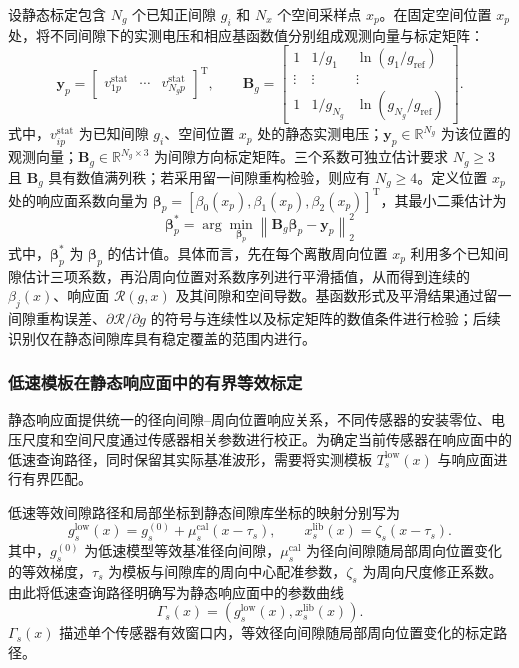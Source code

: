 \documentclass[UTF8,12pt,a4paper]{ctexart}
\newcommand{\Rcal}{\mathcal{R}}
\begin{document}
设静态标定包含 $N_g$ 个已知正间隙 $g_i$ 和 $N_x$ 个空间采样点 $x_p$。在固定空间位置 $x_p$ 处，将不同间隙下的实测电压和相应基函数值分别组成观测向量与标定矩阵：
\begin{equation}
\bm y_p=
\begin{bmatrix}
v_{1p}^{\mathrm{stat}} & \cdots & v_{N_gp}^{\mathrm{stat}}
\end{bmatrix}^{\mathrm T},
\qquad
\bm B_g=
\begin{bmatrix}
1 & 1/g_1 & \ln(g_1/g_{\mathrm{ref}})\\
\vdots & \vdots & \vdots\\
1 & 1/g_{N_g} & \ln(g_{N_g}/g_{\mathrm{ref}})
\end{bmatrix}.
\label{eq:cal_matrix}
\end{equation}
式中，$v_{ip}^{\mathrm{stat}}$ 为已知间隙 $g_i$、空间位置 $x_p$ 处的静态实测电压；$\bm y_p\in\mathbb R^{N_g}$ 为该位置的观测向量；$\bm B_g\in\mathbb R^{N_g\times3}$ 为间隙方向标定矩阵。三个系数可独立估计要求 $N_g\geq3$ 且 $\bm B_g$ 具有数值满列秩；若采用留一间隙重构检验，则应有 $N_g\geq4$。定义位置 $x_p$ 处的响应面系数向量为 $\bm\beta_p=[\beta_0(x_p),\beta_1(x_p),\beta_2(x_p)]^{\mathrm T}$，其最小二乘估计为
\begin{equation}
\bm\beta_p^*
=\arg\min_{\bm\beta_p}
\left\lVert \bm B_g\bm\beta_p-\bm y_p\right\rVert_2^2
\label{eq:cal_ls}
\end{equation}
式中，$\bm\beta_p^*$ 为 $\bm\beta_p$ 的估计值。具体而言，先在每个离散周向位置 $x_p$ 利用多个已知间隙估计三项系数，再沿周向位置对系数序列进行平滑插值，从而得到连续的 $\beta_j(x)$、响应面 $\Rcal(g,x)$ 及其间隙和空间导数。基函数形式及平滑结果通过留一间隙重构误差、$\partial\Rcal/\partial g$ 的符号与连续性以及标定矩阵的数值条件进行检验；后续识别仅在静态间隙库具有稳定覆盖的范围内进行。

\subsubsection{低速模板在静态响应面中的有界等效标定}

静态响应面提供统一的径向间隙--周向位置响应关系，不同传感器的安装零位、电压尺度和空间尺度通过传感器相关参数进行校正。为确定当前传感器在响应面中的低速查询路径，同时保留其实际基准波形，需要将实测模板 $T_s^{\mathrm{low}}(x)$ 与响应面进行有界匹配。

低速等效间隙路径和局部坐标到静态间隙库坐标的映射分别写为
\begin{equation}
g_s^{\mathrm{low}}(x)
=g_s^{(0)}+\mu_s^{\mathrm{cal}}(x-\tau_s),
\qquad
x_s^{\mathrm{lib}}(x)=\zeta_s(x-\tau_s).
\label{eq:low_cal_path}
\end{equation}
其中，$g_s^{(0)}$ 为低速模型等效基准径向间隙，$\mu_s^{\mathrm{cal}}$ 为径向间隙随局部周向位置变化的等效梯度，$\tau_s$ 为模板与间隙库的周向中心配准参数，$\zeta_s$ 为周向尺度修正系数。由此将低速查询路径明确写为静态响应面中的参数曲线
\begin{equation}
\Gamma_s(x)=
\left(g_s^{\mathrm{low}}(x),x_s^{\mathrm{lib}}(x)\right).
\label{eq:query_path}
\end{equation}
$\Gamma_s(x)$ 描述单个传感器有效窗口内，等效径向间隙随局部周向位置变化的标定路径。
\end{document}
